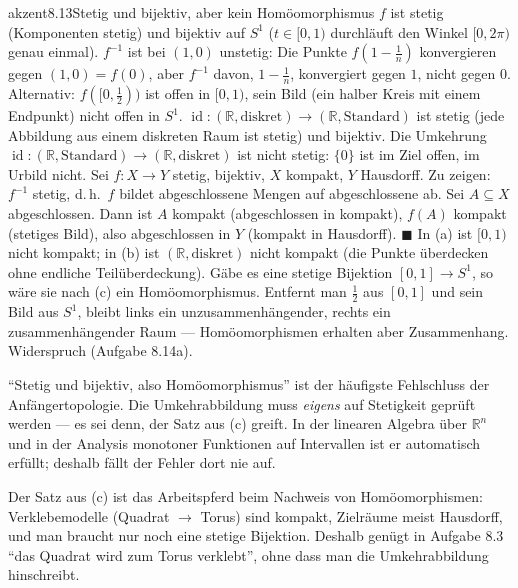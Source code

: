 \begin{loesungkarte}{akzent}{8.13}{Stetig und bijektiv, aber kein Homöomorphismus}
$f$ ist stetig (Komponenten stetig) und bijektiv auf $S^{1}$ ($t\in[0, 1)$ durchläuft den Winkel $[0, 2\pi)$ genau einmal). $f^{-1}$ ist bei $(1, 0)$ unstetig: Die Punkte $f(1 - \frac1n)$ konvergieren gegen $(1, 0) = f(0)$, aber $f^{-1}$ davon, $1 - \frac1n$, konvergiert gegen $1$, nicht gegen $0$. Alternativ: $f([0, \frac12))$ ist offen in $[0, 1)$, sein Bild (ein halber Kreis mit einem Endpunkt) nicht offen in $S^{1}$.
$\operatorname{id}\colon(\mathbb R, \text{diskret})\to(\mathbb R, \text{Standard})$ ist stetig (jede Abbildung aus einem diskreten Raum ist stetig) und bijektiv. Die Umkehrung $\operatorname{id}\colon(\mathbb R, \text{Standard})\to(\mathbb R, \text{diskret})$ ist nicht stetig: $\{0\}$ ist im Ziel offen, im Urbild nicht.
Sei $f\colon X\to Y$ stetig, bijektiv, $X$ kompakt, $Y$ Hausdorff. Zu zeigen: $f^{-1}$ stetig, d.\,h.\ $f$ bildet abgeschlossene Mengen auf abgeschlossene ab. Sei $A\subseteq X$ abgeschlossen. Dann ist $A$ kompakt (abgeschlossen in kompakt), $f(A)$ kompakt (stetiges Bild), also abgeschlossen in $Y$ (kompakt in Hausdorff). $\blacksquare$ In (a) ist $[0, 1)$ nicht kompakt; in (b) ist $(\mathbb R, \text{diskret})$ nicht kompakt (die Punkte überdecken ohne endliche Teilüberdeckung).
Gäbe es eine stetige Bijektion $[0, 1]\to S^{1}$, so wäre sie nach (c) ein Homöomorphismus. Entfernt man $\frac12$ aus $[0, 1]$ und sein Bild aus $S^{1}$, bleibt links ein unzusammenhängender, rechts ein zusammenhängender Raum --- Homöomorphismen erhalten aber Zusammenhang. Widerspruch (Aufgabe 8.14a).
\begin{fehler}\kastentext
\enquote{Stetig und bijektiv, also Homöomorphismus} ist der häufigste Fehlschluss der Anfängertopologie. Die Umkehrabbildung muss \emph{eigens} auf Stetigkeit geprüft werden --- es sei denn, der Satz aus (c) greift. In der linearen Algebra über $\mathbb R^{n}$ und in der Analysis monotoner Funktionen auf Intervallen ist er automatisch erfüllt; deshalb fällt der Fehler dort nie auf.
\end{fehler}
\begin{mitnehmen}\kastentext
Der Satz aus (c) ist das Arbeitspferd beim Nachweis von Homöomorphismen: Verklebemodelle (Quadrat $\to$ Torus) sind kompakt, Zielräume meist Hausdorff, und man braucht nur noch eine stetige Bijektion. Deshalb genügt in Aufgabe 8.3 \enquote{das Quadrat wird zum Torus verklebt}, ohne dass man die Umkehrabbildung hinschreibt.
\end{mitnehmen}
\end{loesungkarte}

